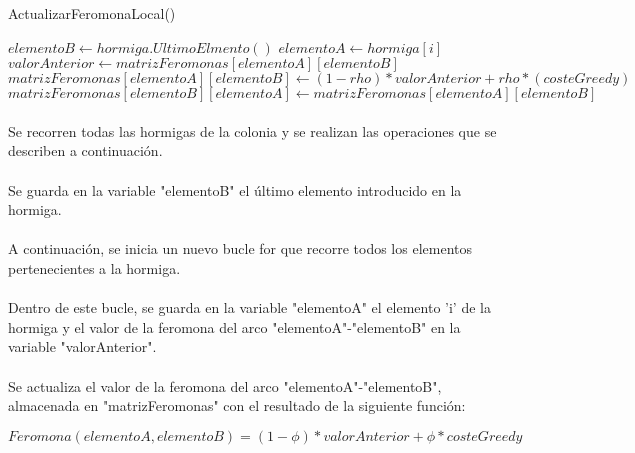 	\begin{algorithm}[H]
		\caption{ActualizarFeromonaLocal()}
		\begin{algorithmic}
			\STATE$elementoB \leftarrow hormiga.UltimoElmento()$
			\STATE$elementoA\leftarrow hormiga[i]$
			\STATE$valorAnterior \leftarrow matrizFeromonas[elementoA][elementoB]$
			\STATE$matrizFeromonas[elementoA][elementoB]\leftarrow (1-rho)*valorAnterior+rho*(costeGreedy)$
			\STATE$matrizFeromonas[elementoB][elementoA]\leftarrow matrizFeromonas[elementoA][elementoB]$
			\ENDFOR
			\ENDFOR
		\end{algorithmic}
	\end{algorithm}

	\paragraph{}Se recorren todas las hormigas de la colonia y se realizan las operaciones que se describen a continuación.
	
	\paragraph{}Se guarda en la variable "elementoB" el último elemento introducido en la hormiga.
	
	\paragraph{}A continuación, se inicia un nuevo bucle for que recorre todos los elementos pertenecientes a la hormiga.
	
	\paragraph{}Dentro de este bucle, se guarda en la variable "elementoA" el elemento 'i' de la hormiga y el valor de la feromona del arco "elementoA"-"elementoB" en la variable "valorAnterior". 
	
	\paragraph{}Se actualiza el valor de la feromona del arco "elementoA"-"elementoB", almacenada en "matrizFeromonas" con el resultado de la siguiente función:
	
	\begin{center}
		$Feromona(elementoA,elementoB) = (1-\phi)*valorAnterior+\phi*costeGreedy$
	\end{center}

